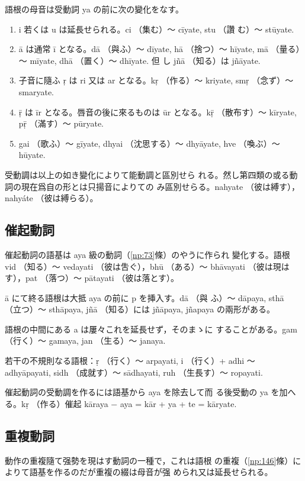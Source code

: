 \numberParagraph
語根の母音は受動詞 ya の前に次の變化をなす。
\begin{enumerate}[label=(\alph*)]
\item i 若くは u は延長せられる。ci （集む）～ cīyate, stu （讚
む）～ stūyate.
\item ā は通常 ī となる。dā （與ふ）～ dīyate, hā （捨つ）～
hīyate, mā （量る）～ mīyate, dhā （置く）～ dhīyate. 但
し jñā （知る）は jñāyate.
\item 子音に隨ふ ṛ は ri 又は ar となる。kṛ （作る）～
kriyate, smṛ （念ず）～ smaryate.
\item ṝ は īr となる。唇音の後に來るものは ūr となる。kṝ
（散布す）～ kīryate, pṝ （滿す）～ pūryate.
\item gai （歌ふ）～ gīyate, dhyai （沈思する）～ dhyāyate, hve
（喚ぶ）～ hūyate.
\end{enumerate}

\numberParagraph
受動調は以上の如き變化によりて能動調と區別せら
れる。然し第四類の或る動詞の現在爲自の形とは只揚音によりての
み區別せらる。nahyate （彼は縛す），nahyáte （彼は縛らる）。

\subsection{催起動詞}
\numberParagraph
催起動詞の語基は aya 級の動詞（\ref{np:73}條）のやうに作られ
變化する。語根 vid （知る）～ vedayati （彼は吿ぐ），bhū （ある）～
bhāvayati （彼は現はす），pat （落つ）～ pātayati （彼は落とす）。

\numberParagraph
ā にて終る語根は大抵 aya の前に p を挿入す。dā （與
ふ）～ dāpaya, sthā （立つ）～ sthāpaya, jñā （知る）には jñāpaya,
jñapaya の兩形がある。

\numberParagraph
語根の中間にある a は屢々これを延長せず，そのまゝに
することがある。gam （行く）～ gamaya, jan （生る）～ janaya.

\numberParagraph
若干の不規則なる語根：ṛ （行く）～ arpayati, i （行く）+
adhi ～ adhyāpayati, sidh （成就す）～ sādhayati, ruh （生長す）～
ropayati.

\numberParagraph
催起動詞の受動調を作るには語基から aya を除去して而
る後受動の ya を加へる。kṛ （作る）催起 kāraya $-$ aya = kār +
ya + te = kāryate.

\subsection{重複動詞}
\numberParagraph
動作の重複隨て强勢を現はす動詞の一種で，これは語根
の重複（\ref{np:146}條）によりて語基を作るのだが重複の綴は母音が强
められ又は延長せられる。

